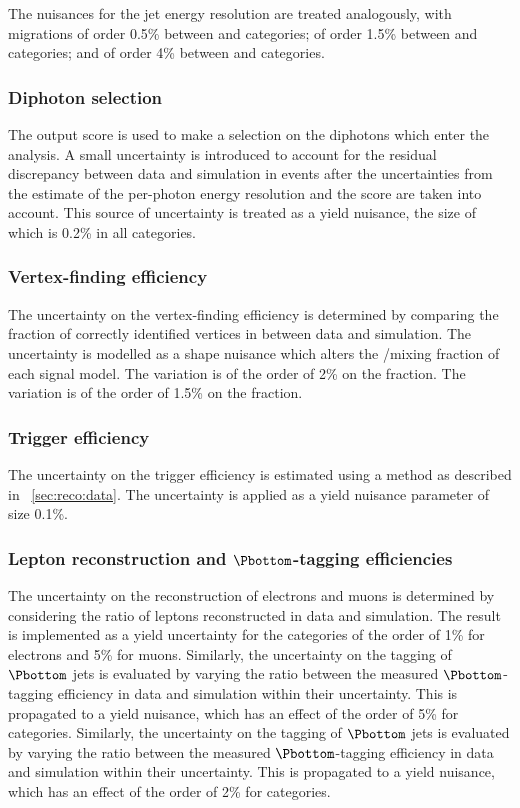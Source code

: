 The nuisances for the jet energy resolution are treated analogously, with migrations of order 0.5\% between  and  categories; of order 1.5\% between \VBF and \Untagged categories; and of order 4\% between \TTHTag and \Untagged categories.

\subsubsection{Diphoton selection}
The \DiPhoBdt output score is used to make a selection on the diphotons which enter the analysis. A small uncertainty is introduced to account for the residual discrepancy between data and simulation in \Zee events after the uncertainties from the estimate of the per-photon energy resolution and the \PhoIdBdt score are taken into account. This source of uncertainty is treated as a yield nuisance, the size of which is 0.2\% in all categories. 

\subsubsection{Vertex-finding efficiency}
The uncertainty on the vertex-finding efficiency is determined by comparing the fraction of correctly identified vertices in \Zmumu between data and simulation. The uncertainty is modelled as a shape nuisance which alters the \RV/\WV mixing fraction of each signal model. 
\ifNewAnalysis
The variation is of the order of 2\% on the \RV fraction.
\else
The variation is of the order of 1.5\% on the \RV fraction.
\fi

\subsubsection{Trigger efficiency}
The uncertainty on the trigger efficiency is estimated using a \TagAndProbe method as described in \Sec~\ref{sec:reco:data}. The uncertainty is applied as a yield nuisance parameter of size 0.1\%.

\subsubsection{Lepton reconstruction and $\Pbottom$-tagging efficiencies}
The uncertainty on the reconstruction of electrons and muons is determined by considering the ratio of leptons reconstructed in data and simulation. The result is implemented as a yield uncertainty for the \TTHTag categories of the order of 1\% for electrons and 5\% for muons.
\ifNewAnalysis
Similarly, the uncertainty on the tagging of $\Pbottom$ jets is evaluated by varying the ratio between the measured $\Pbottom$-tagging efficiency in data and simulation within their uncertainty. This is propagated to a yield nuisance, which has an effect of the order of 5\% for \TTHTag categories.
\else
Similarly, the uncertainty on the tagging of $\Pbottom$ jets is evaluated by varying the ratio between the measured $\Pbottom$-tagging efficiency in data and simulation within their uncertainty. This is propagated to a yield nuisance, which has an effect of the order of 2\% for \TTHTag categories.
\fi

